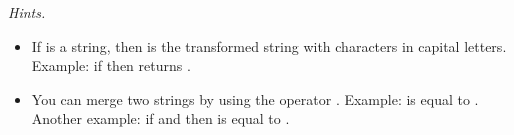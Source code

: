 \documentclass[11pt,class=report,crop=false]{standalone}
\begin{document}
\begin{activite}
\begin{enumerate}
\emph{Hints.} 
\begin{itemize}
  \item If  is a string, then  is the transformed string with characters in capital letters. Example: if  then  returns .
  
  \item {} You can merge two strings by using the operator \og{}\ci{+}\fg{}. Example:  is equal to .  Another example: if  and  then  is equal to .
\end{itemize}
\end{enumerate}
\end{activite}


\end{document}
